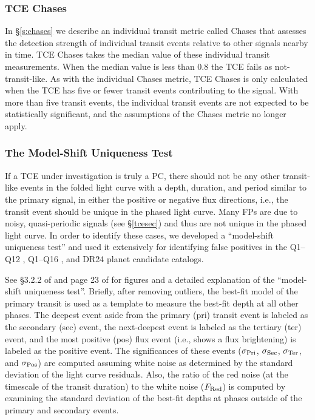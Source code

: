 


\subsubsection{TCE Chases}
\label{s:tcechases}

In \S\ref{s:chases} we describe an individual transit metric called Chases that assesses the detection strength of individual transit events relative to other signals nearby in time. TCE Chases takes the median value of these individual transit measurements.  When the median value is less than 0.8 the TCE fails as not-transit-like.  As with the individual Chases metric, TCE Chases is only calculated when the TCE has five or fewer transit events contributing to the signal.  With more than five transit events, the individual transit events are not expected to be statistically significant, and the assumptions of the Chases metric no longer apply.


\subsubsection{The Model-Shift Uniqueness Test}
\label{s:ms}

If a TCE under investigation is truly a PC, there should not be any other transit-like events in the folded light curve with a depth, duration, and period similar to the primary signal, in either the positive or negative flux directions, i.e., the transit event should be unique in the phased light curve. Many FPs are due to noisy, quasi-periodic signals (see \S\ref{tcesec}) and thus are not unique in the phased light curve. In order to identify these cases, we developed a ``model-shift uniqueness test'' and used it extensively for identifying false positives in the Q1--Q12 \citep{Rowe2015a}, Q1--Q16 \citep{Mullally2015cat}, and DR24 \citep{Coughlin2016} planet candidate catalogs.

See \S3.2.2 of \citet{Rowe2015a} and page 23 of \citet{Coughlin2017b} for figures and a detailed explanation of the ``model-shift uniqueness test''. Briefly, after removing outliers, the best-fit model of the primary transit is used as a template to measure the best-fit depth at all other phases. The deepest event aside from the primary (pri) transit event is labeled as the secondary (sec) event, the next-deepest event is labeled as the tertiary (ter) event, and the most positive (pos) flux event (i.e., shows a flux brightening) is labeled as the positive event. The significances of these events ($\sigma_{\rm Pri}$, $\sigma_{\rm Sec}$, $\sigma_{\rm Ter}$, and $\sigma_{\rm Pos}$) are computed assuming white noise as determined by the standard deviation of the light curve residuals. Also, the ratio of the red noise (at the timescale of the transit duration) to the white noise ($F_{\rm Red}$) is computed by examining the standard deviation of the best-fit depths at phases outside of the primary and secondary events.  

